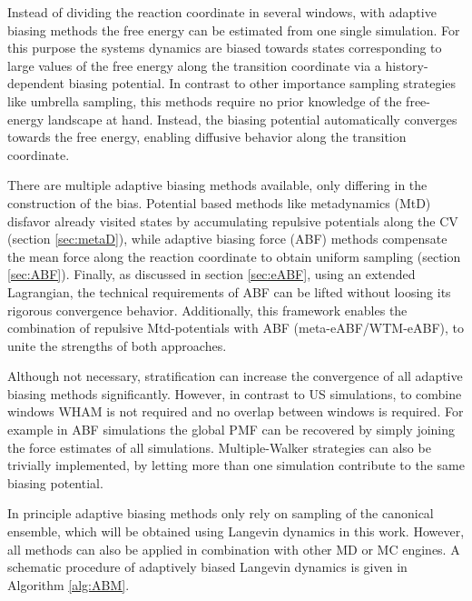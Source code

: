Instead of dividing the reaction coordinate in several windows, with adaptive biasing methods the free energy can be estimated from one single simulation. For this purpose the systems dynamics are biased towards states corresponding to large values of the free energy along the transition coordinate via a history-dependent biasing potential. In contrast to other importance sampling strategies like umbrella sampling, this methods require no prior knowledge of the free-energy landscape at hand. Instead, the biasing potential automatically converges towards the free energy, enabling diffusive behavior along the transition coordinate.\autocite{comer2015adaptive, barducci2011metadynamics}

There are multiple adaptive biasing methods available, only differing in the construction of the bias. Potential based methods like metadynamics (MtD) disfavor already visited states by accumulating repulsive potentials along the CV (section \ref{sec:metaD}), while adaptive biasing force (ABF) methods compensate the mean force along the reaction coordinate to obtain uniform sampling (section \ref{sec:ABF}). Finally, as discussed in section \ref{sec:eABF}, using an extended Lagrangian, the technical requirements of ABF can be lifted without loosing its rigorous convergence behavior.\autocite{lesage2017smoothed} Additionally, this framework enables the combination of repulsive Mtd-potentials with ABF (meta-eABF/WTM-eABF), to unite the strengths of both approaches.\autocite{fu2018zooming,fu2019taming}

Although not necessary, stratification can increase the convergence of all adaptive biasing methods significantly. However, in contrast to US simulations, to combine windows WHAM is not required and no overlap between windows is required. For example in ABF simulations the global PMF can be recovered by simply joining the force estimates of all simulations.\autocite{comer2015adaptive} Multiple-Walker strategies can also be trivially implemented, by letting more than one simulation contribute to the same biasing potential.\autocite{minoukadeh2010potential}

In principle adaptive biasing methods only rely on sampling of the canonical ensemble, which will be obtained using Langevin dynamics in this work. However, all methods can also be applied in combination with other MD or MC engines. A schematic procedure of adaptively biased Langevin dynamics is given in Algorithm \ref{alg:ABM}.

